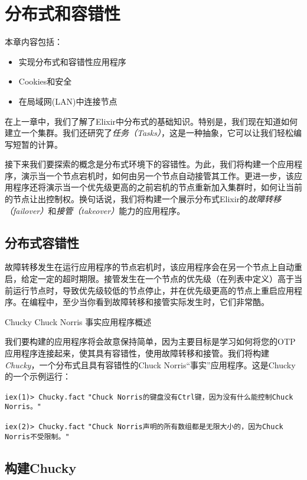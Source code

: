 \chapter{分布式和容错性}\label{chapt:distribution}

本章内容包括：

\begin{itemize}

\item
  实现分布式和容错性应用程序
\item
  Cookies和安全
\item
  在局域网(LAN)中连接节点
\end{itemize}

在上一章中，我们了解了Elixir中分布式的基础知识。特别是，我们现在知道如何建立一个集群。我们还研究了\emph{任务（Tasks）}，这是一种抽象，它可以让我们轻松编写短暂的计算。

接下来我们要探索的概念是分布式环境下的容错性。为此，我们将构建一个应用程序，演示当一个节点宕机时，如何由另一个节点自动接管其工作。更进一步，该应用程序还将演示当一个优先级更高的之前宕机的节点重新加入集群时，如何让当前的节点让出控制权。换句话说，我们将构建一个展示分布式Elixir的\emph{故障转移（failover）}和\emph{接管（takeover）}能力的应用程序。

\section{分布式容错性}

故障转移发生在运行应用程序的节点宕机时，该应用程序会在另一个节点上自动重启，给定一定的超时期限。接管发生在一个节点的优先级（在列表中定义）高于当前运行节点时，导致优先级较低的节点停止，并在优先级更高的节点上重启应用程序。在编程中，至少当你看到故障转移和接管实际发生时，它们非常酷。

Chucky Chuck Norris 事实应用程序概述

我们要构建的应用程序将会故意保持简单，因为主要目标是学习如何将您的OTP应用程序连接起来，使其具有容错性，使用故障转移和接管。我们将构建\emph{Chucky}，一个分布式且具有容错性的Chuck
Norris``事实''应用程序。这是Chucky的一个示例运行：

\texttt{iex(1)> Chucky.fact}
\texttt{"Chuck Norris的键盘没有Ctrl键，因为没有什么能控制Chuck Norris。"}

\texttt{iex(2)> Chucky.fact}
\texttt{"Chuck Norris声明的所有数组都是无限大小的，因为Chuck Norris不受限制。"}
\section{构建Chucky}

